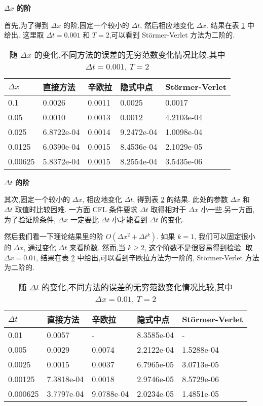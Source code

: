 \textbf{$\Delta x$ 的阶}

首先,为了得到 $\Delta x$ 的阶,固定一个较小的 $\Delta t$, 然后相应地变化 $\Delta x$. 结果在表 \ref{tab:dx1} 中给出. 这里取 $\Delta t=0.001$ 和 $T=2$,可以看到 St\"{o}rmer-Verlet 方法为二阶的.

\begin{table}[h]
  \centering
\caption{随 $\Delta x$ 的变化,不同方法的误差的无穷范数变化情况比较,其中 $\Delta t=0.001$, $T=2$}
\begin{tabularx}{\linewidth}{XXXXX}
 \toprule[1.5pt]
 $\Delta x$ &直接方法 & 辛欧拉 & 隐式中点 & St\"{o}rmer-Verlet\\
 \midrule[1pt]
 0.1 & 0.0026 & 0.0011 & 0.0025 & 0.0017\\
 0.05 & 0.0010 & 0.0013 & 0.0012 & 4.2103e-04\\
 0.025 & 6.8722e-04 & 0.0014 & 9.2472e-04 & 1.0098e-04\\
 0.0125 & 6.0390e-04 & 0.0015 & 8.4536e-04 & 2.1029e-05\\
 0.00625 & 5.8372e-04 & 0.0015 & 8.2554e-04 & 3.5435e-06\\
 \bottomrule[1.5pt]
\end{tabularx}
  \label{tab:dx1}
\end{table}

\textbf{$\Delta t$ 的阶}

其次,固定一个较小的 $\Delta x$, 相应地变化 $\Delta t$, 得到表 \ref{tab:dt1} 的结果. 此处的参数 $\Delta x$ 和 $\Delta t$ 取值时比较困难. 一方面 CFL 条件要求 $\Delta t$ 取得相对于 $\Delta x$ 小一些.另一方面,为了验证阶条件, $\Delta x$ 一定要比 $\Delta t$ 小才能看到 $\Delta t$ 的变化.

然后我们看一下理论结果里的阶 $O(\Delta x^2+ \Delta t^k)$. 如果 $k =
1$, 我们可以固定很小的 $\Delta x$, 通过变化 $\Delta t$ 来看阶数. 然而,当 $k \ge 2$, 这个阶数不是很容易得到检验. 取 $\Delta x = 0.01$, 结果在表 \ref{tab:dt1} 中给出,可以看到辛欧拉方法为一阶的, St\"{o}rmer-Verlet 方法为二阶的.

\begin{table}[h]
  \centering
\caption{随 $\Delta t$ 的变化,不同方法的误差的无穷范数变化情况比较,其中 $\Delta x=0.01$, $T=2$}
\begin{tabularx}{\linewidth}{XXXXX}
 \toprule[1.5pt]
 $\Delta t$ &直接方法 & 辛欧拉 & 隐式中点 & St\"{o}rmer-Verlet\\
 \midrule[1pt]
 0.01 & 0.0057 & - & 8.3585e-04 & - \\
 0.005 & 0.0029 & 0.0074 & 2.2122e-04 & 1.5288e-04 \\
 0.0025 & 0.0015 & 0.0037 & 6.7965e-05 & 3.0713e-05 \\
 0.00125 & 7.3818e-04 & 0.0018 & 2.9746e-05 & 8.5729e-06 \\
 0.000625 & 3.7797e-04 & 9.0788e-04 & 2.0234e-05 & 1.4851e-05 \\
 \bottomrule[1.5pt]
\end{tabularx}
  \label{tab:dt1}
\end{table}


